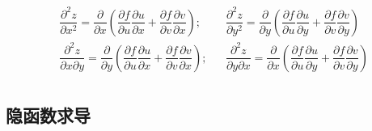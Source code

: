 \begin{equation*}
    \begin{aligned}
        &\dfrac{\partial^2 z}{\partial x^2} = \dfrac{\partial }{\partial x}
        \left(
            \dfrac{\partial f}{\partial u}\dfrac{\partial u}{\partial x}
        +\dfrac{\partial f}{\partial v}\dfrac{\partial v}{\partial x}
        \right);&
        &\dfrac{\partial^2 z}{\partial y^2} = \dfrac{\partial }{\partial y}
        \left(
            \dfrac{\partial f}{\partial u}\dfrac{\partial u}{\partial y}
        +\dfrac{\partial f}{\partial v}\dfrac{\partial v}{\partial y}
        \right)\\ 
        &\dfrac{\partial^2 z}{\partial x\partial y} = \dfrac{\partial }{\partial y}
        \left(
            \dfrac{\partial f}{\partial u}\dfrac{\partial u}{\partial x}
        +\dfrac{\partial f}{\partial v}\dfrac{\partial v}{\partial x}
        \right);&
        &\dfrac{\partial^2 z}{\partial y\partial x} = \dfrac{\partial }{\partial x}
        \left(
            \dfrac{\partial f}{\partial u}\dfrac{\partial u}{\partial y}
        +\dfrac{\partial f}{\partial v}\dfrac{\partial v}{\partial y}
        \right)\\ 
    \end{aligned}
\end{equation*}

\begin{comment}
$$
    \dfrac{\partial^2 z}{\partial x^2}  = \dfrac{\partial \frac{\partial z}{\partial x}}{\partial u}\dfrac{\partial u}{\partial x}
    +\dfrac{\partial \frac{\partial z}{\partial x}}{\partial v}\dfrac{\partial v}{\partial x};\quad{}
    \dfrac{\partial z^2}{\partial y^2} = \dfrac{\partial \frac{\partial z}{\partial y}}{\partial u}\dfrac{\partial u}{\partial y}
    +\dfrac{\partial \frac{\partial z}{\partial y}}{\partial v}\dfrac{\partial v}{\partial y};
$$     
\end{comment}


\subsection{隐函数求导}

